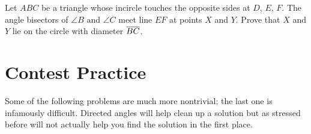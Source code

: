 \documentclass[11pt]{scrartcl}
\begin{document}
\begin{problem}
	Let $ABC$ be a triangle whose incircle touches the opposite sides
	at $D$, $E$, $F$.
	The angle bisectors of $\angle B$ and $\angle C$ meet
	line $EF$ at points $X$ and $Y$.
	Prove that $X$ and $Y$ lie on the circle with diameter $\overline{BC}$.
\end{problem}

\section{Contest Practice}
Some of the following problems are much more nontrivial;
the last one is infamously difficult.
Directed angles will help clean up a solution
but as stressed before will not actually help you find 
the solution in the first place.
\end{document}
